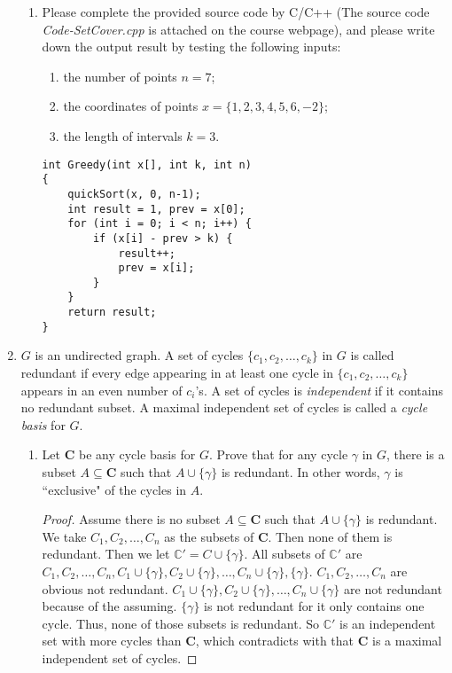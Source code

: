 \documentclass[12pt,a4paper]{article}
\theoremstyle{definition}
\begin{document}
\begin{enumerate}
\begin{enumerate}
        \item Please complete the provided source code by C/C++ {\color{blue}(The source code \emph{Code-SetCover.cpp} is attached on the course webpage)}, and please write down the output result by testing the following inputs:
            \begin{enumerate}
            \item the number of points $n=7$;
            \item the coordinates of points
                $x=\{1,2,3,4,5,6,-2\}$;
            \item the length of intervals
                $k=3$.
            \end{enumerate}
            \begin{verbatim}
int Greedy(int x[], int k, int n)
{
    quickSort(x, 0, n-1);
    int result = 1, prev = x[0];
    for (int i = 0; i < n; i++) {
        if (x[i] - prev > k) {
            result++;
            prev = x[i];
        }
    }
    return result;
}
        \end{verbatim}
    \end{enumerate}

\item $G$ is an undirected graph. A set of cycles $\{c_1, c_2, \ldots , c_k\}$ in $G$ is called redundant if every
    edge appearing in at least one cycle in $\{c_1, c_2, \ldots , c_k\}$ appears in an even number of $c_i$'s. A set of cycles is \emph{independent} if it contains no
    redundant subset. A maximal independent set of cycles is called a \emph{cycle basis} for $G$.

\begin{enumerate}
\item Let $\mathbf{C}$ be any cycle basis for $G$. Prove that for any cycle $\gamma$ in $G$, there is a subset $A \subseteq \mathbf{C}$ such that $A \cup \{\gamma\}$ is redundant. In other words, $\gamma$ is ``exclusive" of the cycles in $A$.

    \begin{proof} Assume there is no subset $A \subseteq \mathbf{C}$ such that $A \cup \{\gamma\}$ is redundant. We take $C_1,C_2,\dots,C_n$ as the subsets of $\mathbf{C}$. Then none of them is redundant. Then we let $\mathbb{C'}=C\cup\{\gamma\}$. All subsets of $\mathbb{C'}$ are $C_1,C_2,\dots,C_n,C_1\cup\{\gamma\},C_2\cup\{\gamma\},\dots,C_n\cup\{\gamma\},\{\gamma\}$. $C_1,C_2,\dots,C_n$ are obvious not redundant. $C_1\cup\{\gamma\},C_2\cup\{\gamma\},\dots,C_n\cup\{\gamma\}$ are not redundant because of the assuming. $\{\gamma\}$ is not redundant for it only contains one cycle. Thus, none of those subsets is redundant. So $\mathbb{C'}$ is an independent set with more cycles than $\mathbf{C}$, which contradicts with that $\mathbf{C}$ is a maximal independent set of cycles.


\end{proof}
\end{enumerate}
\end{enumerate}
\end{document}
